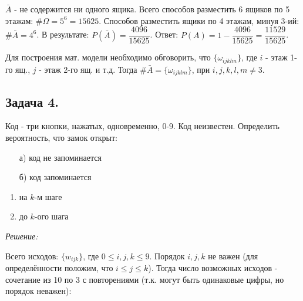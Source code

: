 \noindent $\bar A$ - не содержится ни одного ящика. Всего способов разместить 6 ящиков по 5 этажам: $\#\Omega = 5^6 = 15625$. Способов разместить ящики по 4 этажам, минуя 3-ий: $\# \bar A = 4^6$. В результате: $P(\bar A) = \dfrac{4096}{15625}$. Ответ: $P(A) = 1 - \dfrac{4096}{15625} = \dfrac{11529}{15625}$.

Для построения мат. модели необходимо обговорить, что $\{\omega_{i j k l m}\}$, где $i$ - этаж 1-го ящ., $j$ - этаж 2-го ящ. и т.д. Тогда $\# \bar A = \{\omega_{i j k l m}\}$, при $i,j,k,l,m \ne 3$.

\subsection{Задача 4.}

Код - три кнопки, нажатых, одновременно, 0-9. Код неизвестен. Определить вероятность, что замок открыт:
\begin{enumerate}
	\item[а)] код не запоминается
	\item[б)] код запоминается
\end{enumerate}

\begin{enumerate}
	\item на $k$-м шаге
	\item до $k$-ого шага
\end{enumerate}

\textit{Решение:}

Всего исходов: $\{w_{ijk}\}$, где $0 \le i,j,k \le 9$. Порядок $i,j,k$ не важен (для определённости положим, что $i \le j \le k$). Тогда число возможных исходов - сочетание из 10 по 3 с повторениями (т.к. могут быть одинаковые цифры, но порядок неважен):

